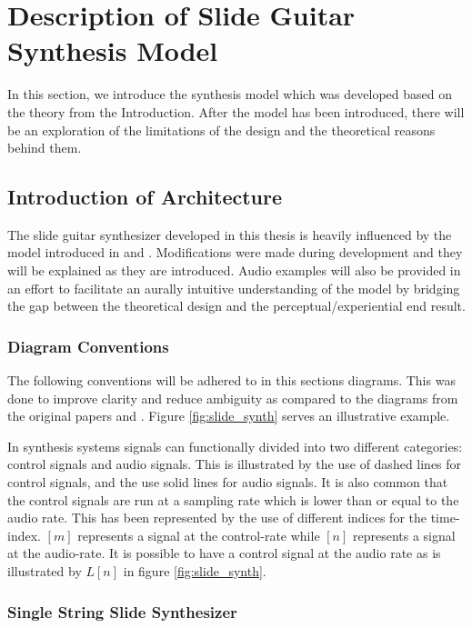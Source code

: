 \documentclass[../main.tex]{subfiles}
\begin{document}
\chapter{Description of Slide Guitar Synthesis Model}
In this section, we introduce the synthesis model which was developed based on the theory from the Introduction. After the model has been introduced, there will be an exploration of the limitations of the design and the theoretical reasons behind them.

\section{Introduction of Architecture}
The slide guitar synthesizer developed in this thesis is heavily influenced by the model introduced in  and . Modifications were made during development and they will be explained as they are introduced. Audio examples will also be provided in an effort to facilitate an aurally intuitive understanding of the model by bridging the gap between the theoretical design and the perceptual/experiential end result.

\subsection{Diagram Conventions}
The following conventions will be adhered to in this sections diagrams. This was done to improve clarity and reduce ambiguity as compared to the diagrams from the original papers  and . Figure \ref{fig:slide_synth} serves an illustrative example.

In synthesis systems signals can functionally divided into two different categories: control signals and audio signals. This is illustrated by the use of dashed lines for control signals, and the use solid lines for audio signals. It is also common that the control signals are run at a sampling rate which is lower than or equal to the audio rate. This has been represented by the use of different indices for the time-index. $[m]$ represents a signal at the control-rate while $[n]$ represents a signal at the audio-rate. It is possible to have a control signal at the audio rate as is illustrated by $L[n]$ in figure \ref{fig:slide_synth}.

\subsection{Single String Slide Synthesizer}
\end{document}
